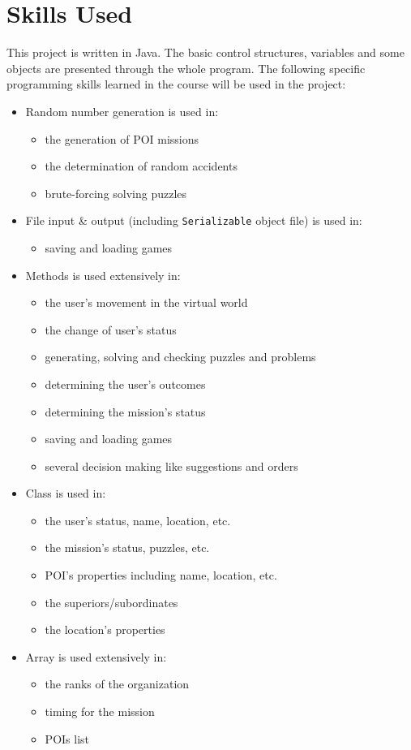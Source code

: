 \documentclass[letterpaper,12pt]{article}
\begin{document}
\section{Skills Used}
	This project is written in Java. The basic control structures, variables and some objects are presented through the whole program. The following specific programming skills learned in the course will be used in the project:
	\begin{itemize}
		\item Random number generation is used in: 
			\begin{itemize}
				\item the generation of POI missions
				\item the determination of random accidents
				\item brute-forcing solving puzzles
			\end{itemize}
		\item File input \& output (including \texttt{Serializable} object file) is used in:
		    \begin{itemize}
		        \item saving and loading games
		    \end{itemize}
		\item Methods is used extensively in:
			\begin{itemize}
				\item the user's movement in the virtual world
				\item the change of user's status
				\item generating, solving and checking puzzles and problems
				\item determining the user's outcomes
				\item determining the mission's status
				\item saving and loading games
				\item several decision making like suggestions and orders
			\end{itemize}
		\item Class is used in:
			\begin{itemize}
				\item the user's status, name, location, etc.
				\item the mission's status, puzzles, etc.
				\item POI's properties including name, location, etc.
				\item the superiors/subordinates
				\item the location's properties
			\end{itemize}
		\item Array is used extensively in:
			\begin{itemize}
				\item the ranks of the organization
				\item timing for the mission
				\item POIs list
			\end{itemize}
	\end{itemize}
\end{document}
